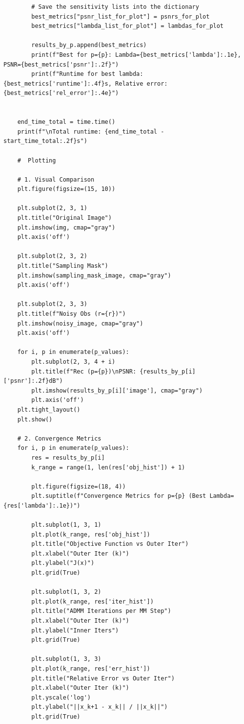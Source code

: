 \documentclass[12pt,a4paper,onecolumn]{exam}
\begin{document}
\begin{lstlisting}
        # Save the sensitivity lists into the dictionary
        best_metrics["psnr_list_for_plot"] = psnrs_for_plot
        best_metrics["lambda_list_for_plot"] = lambdas_for_plot
        
        results_by_p.append(best_metrics)
        print(f"Best for p={p}: Lambda={best_metrics['lambda']:.1e}, PSNR={best_metrics['psnr']:.2f}")
        print(f"Runtime for best lambda: {best_metrics['runtime']:.4f}s, Relative error: {best_metrics['rel_error']:.4e}")


    end_time_total = time.time()
    print(f"\nTotal runtime: {end_time_total - start_time_total:.2f}s")

    #  Plotting 
    
    # 1. Visual Comparison
    plt.figure(figsize=(15, 10))
    
    plt.subplot(2, 3, 1)
    plt.title("Original Image")
    plt.imshow(img, cmap="gray")
    plt.axis('off')
    
    plt.subplot(2, 3, 2)
    plt.title("Sampling Mask")
    plt.imshow(sampling_mask_image, cmap="gray")
    plt.axis('off')
    
    plt.subplot(2, 3, 3)
    plt.title(f"Noisy Obs (r={r})")
    plt.imshow(noisy_image, cmap="gray")
    plt.axis('off')
    
    for i, p in enumerate(p_values):
        plt.subplot(2, 3, 4 + i)
        plt.title(f"Rec (p={p})\nPSNR: {results_by_p[i]['psnr']:.2f}dB")
        plt.imshow(results_by_p[i]['image'], cmap="gray")
        plt.axis('off')
    plt.tight_layout()
    plt.show()

    # 2. Convergence Metrics
    for i, p in enumerate(p_values):
        res = results_by_p[i]
        k_range = range(1, len(res['obj_hist']) + 1)
        
        plt.figure(figsize=(18, 4))
        plt.suptitle(f"Convergence Metrics for p={p} (Best Lambda={res['lambda']:.1e})")
        
        plt.subplot(1, 3, 1)
        plt.plot(k_range, res['obj_hist'])
        plt.title("Objective Function vs Outer Iter")
        plt.xlabel("Outer Iter (k)")
        plt.ylabel("J(x)")
        plt.grid(True)
        
        plt.subplot(1, 3, 2)
        plt.plot(k_range, res['iter_hist'])
        plt.title("ADMM Iterations per MM Step")
        plt.xlabel("Outer Iter (k)")
        plt.ylabel("Inner Iters")
        plt.grid(True)
        
        plt.subplot(1, 3, 3)
        plt.plot(k_range, res['err_hist'])
        plt.title("Relative Error vs Outer Iter")
        plt.xlabel("Outer Iter (k)")
        plt.yscale('log')
        plt.ylabel("||x_k+1 - x_k|| / ||x_k||")
        plt.grid(True)
        

\end{lstlisting}
\end{document}
